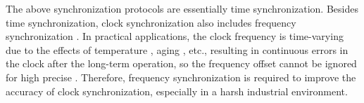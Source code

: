 \documentclass[conference]{IEEEtran}
\begin{document}


The above synchronization protocols are essentially time synchronization. Besides time synchronization, clock synchronization also includes frequency synchronization \cite {ref4}. In practical applications, the clock frequency is time-varying due to the effects of temperature \cite{ref4}, aging \cite{ref27}, etc., resulting in continuous errors in the clock after the long-term operation, so the frequency offset cannot be ignored for high precise \cite{ref26}. Therefore, frequency synchronization is required to improve the accuracy of clock synchronization, especially in a harsh industrial environment.
\end{document}
